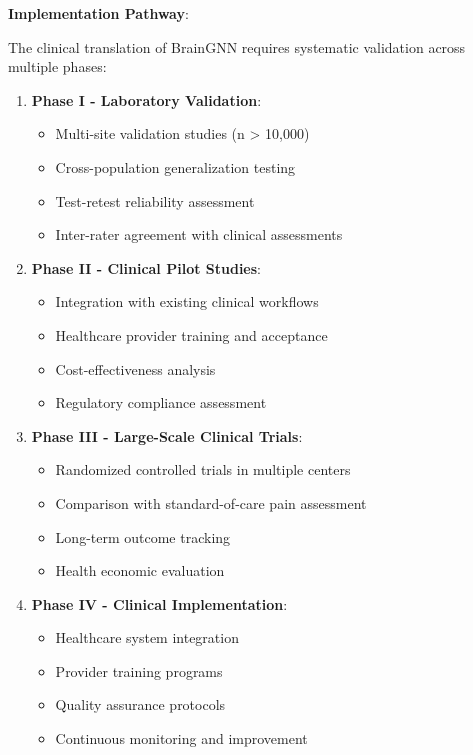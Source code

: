 \textbf{Implementation Pathway}:

The clinical translation of BrainGNN requires systematic validation across multiple phases:

\begin{enumerate}
\item \textbf{Phase I - Laboratory Validation}:
   \begin{itemize}
   \item Multi-site validation studies (n > 10,000)
   \item Cross-population generalization testing
   \item Test-retest reliability assessment
   \item Inter-rater agreement with clinical assessments
   \end{itemize}

\item \textbf{Phase II - Clinical Pilot Studies}:
   \begin{itemize}
   \item Integration with existing clinical workflows
   \item Healthcare provider training and acceptance
   \item Cost-effectiveness analysis
   \item Regulatory compliance assessment
   \end{itemize}

\item \textbf{Phase III - Large-Scale Clinical Trials}:
   \begin{itemize}
   \item Randomized controlled trials in multiple centers
   \item Comparison with standard-of-care pain assessment
   \item Long-term outcome tracking
   \item Health economic evaluation
   \end{itemize}

\item \textbf{Phase IV - Clinical Implementation}:
   \begin{itemize}
   \item Healthcare system integration
   \item Provider training programs
   \item Quality assurance protocols
   \item Continuous monitoring and improvement
   \end{itemize}
\end{enumerate}

